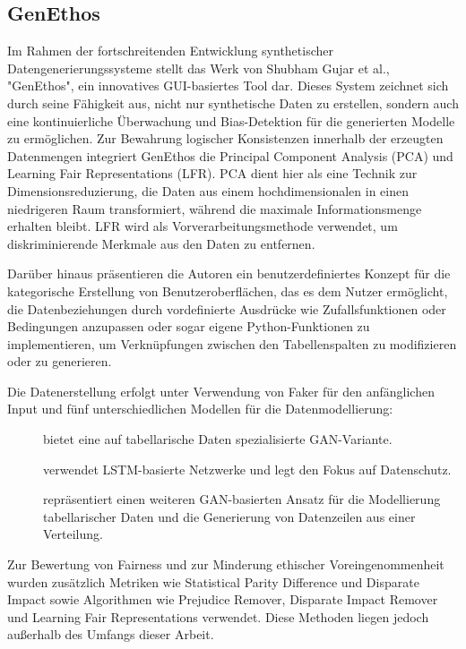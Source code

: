 \subsection{GenEthos}
Im Rahmen der fortschreitenden Entwicklung synthetischer Datengenerierungssysteme stellt das Werk von Shubham Gujar et al.\cite{9885653}, "GenEthos",
ein innovatives GUI-basiertes Tool dar. Dieses System zeichnet sich durch seine Fähigkeit aus, nicht nur synthetische Daten zu erstellen,
sondern auch eine kontinuierliche Überwachung und Bias-Detektion für die generierten Modelle zu ermöglichen.
Zur Bewahrung logischer Konsistenzen innerhalb der erzeugten Datenmengen integriert GenEthos die Principal Component Analysis (PCA) und Learning Fair Representations (LFR).
PCA dient hier als eine Technik zur Dimensionsreduzierung, die Daten aus einem hochdimensionalen in einen niedrigeren Raum transformiert, während die maximale
Informationsmenge erhalten bleibt\cite{PCA_Explained}. LFR wird als Vorverarbeitungsmethode verwendet, um diskriminierende Merkmale aus den Daten zu entfernen\cite{LFR_Explained}.

Darüber hinaus präsentieren die Autoren ein benutzerdefiniertes Konzept für die kategorische Erstellung von Benutzeroberflächen, das es dem Nutzer ermöglicht,
die Datenbeziehungen durch vordefinierte Ausdrücke wie Zufallsfunktionen oder Bedingungen anzupassen oder sogar eigene Python-Funktionen zu implementieren, um Verknüpfungen zwischen den Tabellenspalten zu modifizieren oder zu generieren.

Die Datenerstellung erfolgt unter Verwendung von Faker\cite{Faker} für den anfänglichen Input und fünf unterschiedlichen Modellen für die Datenmodellierung:

\begin{description}
    \item[] bietet eine auf tabellarische Daten spezialisierte GAN-Variante.
    \item[] verwendet LSTM-basierte Netzwerke und legt den Fokus auf Datenschutz.
    \item[] repräsentiert einen weiteren GAN-basierten Ansatz für die Modellierung tabellarischer Daten und die Generierung von Datenzeilen aus einer Verteilung.
\end{description}

Zur Bewertung von Fairness und zur Minderung ethischer Voreingenommenheit wurden zusätzlich Metriken wie Statistical Parity Difference und Disparate Impact sowie Algorithmen wie Prejudice Remover,
Disparate Impact Remover und Learning Fair Representations verwendet. Diese Methoden liegen jedoch außerhalb des Umfangs dieser Arbeit.

